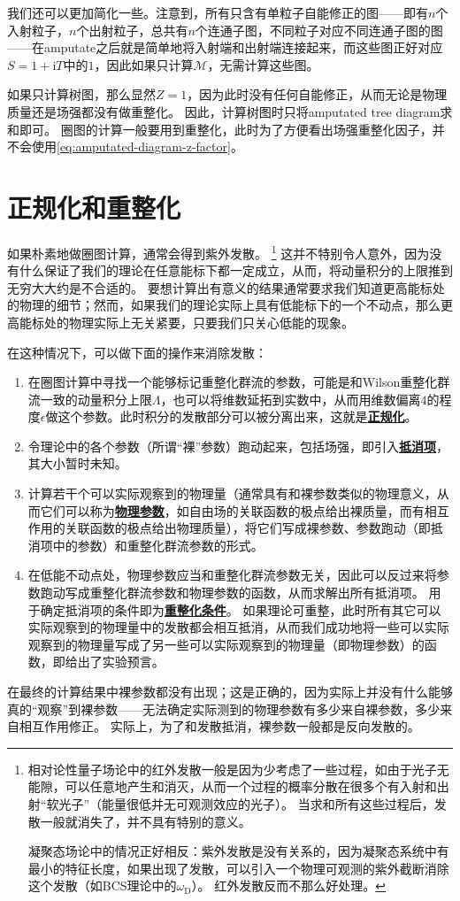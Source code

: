 \documentclass[hyperref, UTF8, a4paper]{ctexart}
\newcommand*{\ii}{\mathrm{i}}
\newcommand{\concept}[1]{\underline{\textbf{#1}}}
\begin{document}
我们还可以更加简化一些。注意到，所有只含有单粒子自能修正的图——即有$n$个入射粒子，$n$个出射粒子，总共有$n$个连通子图，不同粒子对应不同连通子图的图——在amputate之后就是简单地将入射端和出射端连接起来，而这些图正好对应$S=1 + \ii T$中的$1$，因此如果只计算$\mathcal{M}$，无需计算这些图。

如果只计算树图，那么显然$Z=1$，因为此时没有任何自能修正，从而无论是物理质量还是场强都没有做重整化。
因此，计算树图时只将amputated tree diagram求和即可。
圈图的计算一般要用到重整化，此时为了方便看出场强重整化因子，并不会使用\eqref{eq:amputated-diagram-z-factor}。


\section{正规化和重整化}

如果朴素地做圈图计算，通常会得到紫外发散。%
\footnote{
    相对论性量子场论中的红外发散一般是因为少考虑了一些过程，如由于光子无能隙，可以任意地产生和消灭，从而一个过程的概率分散在很多个有入射和出射“软光子”（能量很低并无可观测效应的光子）。
    当求和所有这些过程后，发散一般就消失了，并不具有特别的意义。

    凝聚态场论中的情况正好相反：紫外发散是没有关系的，因为凝聚态系统中有最小的特征长度，如果出现了发散，可以引入一个物理可观测的紫外截断消除这个发散（如BCS理论中的$\omega_\text{D}$）。
    红外发散反而不那么好处理。
}%
这并不特别令人意外，因为没有什么保证了我们的理论在任意能标下都一定成立，从而，将动量积分的上限推到无穷大大约是不合适的。
要想计算出有意义的结果通常要求我们知道更高能标处的物理的细节；然而，如果我们的理论实际上具有低能标下的一个不动点，那么更高能标处的物理实际上无关紧要，只要我们只关心低能的现象。

在这种情况下，可以做下面的操作来消除发散：
\begin{enumerate}
    \item 在圈图计算中寻找一个能够标记重整化群流的参数，可能是和Wilson重整化群流一致的动量积分上限$\Lambda$，也可以将维数延拓到实数中，从而用维数偏离$4$的程度$\epsilon$做这个参数。此时积分的发散部分可以被分离出来，这就是\concept{正规化}。
    \item 令理论中的各个参数（所谓“裸”参数）跑动起来，包括场强，即引入\concept{抵消项}，其大小暂时未知。
    \item 计算若干个可以实际观察到的物理量（通常具有和裸参数类似的物理意义，从而它们可以称为\concept{物理参数}，如自由场的关联函数的极点给出裸质量，而有相互作用的关联函数的极点给出物理质量），将它们写成裸参数、参数跑动（即抵消项中的参数）和重整化群流参数的形式。
    \item 在低能不动点处，物理参数应当和重整化群流参数无关，因此可以反过来将参数跑动写成重整化群流参数和物理参数的函数，从而求解出所有抵消项。
    用于确定抵消项的条件即为\concept{重整化条件}。
    如果理论可重整，此时所有其它可以实际观察到的物理量中的发散都会相互抵消，从而我们成功地将一些可以实际观察到的物理量写成了另一些可以实际观察到的物理量（即物理参数）的函数，即给出了实验预言。
\end{enumerate}
在最终的计算结果中裸参数都没有出现；这是正确的，因为实际上并没有什么能够真的“观察”到裸参数——无法确定实际测到的物理参数有多少来自裸参数，多少来自相互作用修正。
实际上，为了和发散抵消，裸参数一般都是反向发散的。
\end{document}
